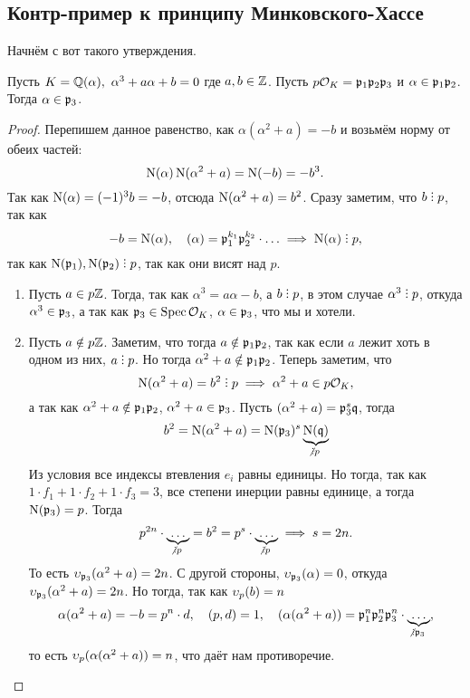 	  \subsection{Контр-пример к принципу Минковского-Хассе}

	  Начнём с вот такого утверждения. 

	  \begin{statement}[ДЗ 11, задача 3]\label{prop-alpha} 
	  	Пусть $K = \mathbb{Q}(\alpha), \ \alpha^3 + a \alpha + b = 0$ где $a, b \in \mathbb{Z}$. Пусть $p\mathcal{O}_{K} = \mathfrak{p}_1 \mathfrak{p}_2 \mathfrak{p}_3$ и $\alpha \in \mathfrak{p}_1 \mathfrak{p}_2$. Тогда $\alpha \in \mathfrak{p}_3$.
	  \end{statement}
	  \begin{proof}
	  	Перепишем данное равенство, как $\alpha(\alpha^2 + a) = - b$ и возьмём норму от обеих частей: 
	  	\[
	  		\operatorname{\mathrm{N}}(\alpha)\operatorname{\mathrm{N}}(\alpha^2 + a) = \operatorname{\mathrm{N}}(-b) = - b^3.
	  	\]
	  	Так как $\operatorname{\mathrm{N}}(\alpha) = (-1)^3 b = -b$, отсюда $\operatorname{\mathrm{N}}(\alpha^2 + a) = b^2$.  Сразу заметим, что $b \divby p$, так как 
	  	\[
	  		-b = \Nm(\alpha) , \quad (\alpha) = \fp_1^{k_1} \fp_{2}^{k_2} \cdot \ldots \implies \Nm(\alpha) \divby p,
	  	\]
	  	так как $\Nm(\fp_1), \Nm(\fp_2) \divby p$, так как они висят над $p$.

	  	\begin{enumerate}
	  		\item Пусть $a \in p\mathbb{Z}$. Тогда, так как $\alpha^3 = a\alpha - b$,  а $b \divby p$, в этом случае $\alpha^3 \divby p$, откуда $\alpha^3 \in \mathfrak{p}_{3}$, а так как $\mathfrak{p}_3 \in \operatorname{Spec}{\mathcal{O}_{K}}$, $\alpha \in \mathfrak{p}_3$, что мы и хотели. 

	  		\item Пусть $a \notin p\mathbb{Z}$. Заметим, что тогда $a \notin \mathfrak{p}_1 \mathfrak{p}_2$, так как если $a$ лежит хоть в одном из них, $a \divby p$.  Но тогда $\alpha^2 + a \notin \mathfrak{p}_1 \mathfrak{p}_2$. Теперь заметим, что 
	  		\[
	  			\Nm(\alpha^2 + a) = b^2 \divby p \implies \alpha^2 + a \in p\cO_{K}, 
	  		\]
	  		а так как $\alpha^2 + a \notin \mathfrak{p}_1\mathfrak{p}_2$, $\alpha^2  + a \in \mathfrak{p}_3$. Пусть $(\alpha^2 + a) = \mathfrak{p}_3^s \mathfrak{q}$, тогда 
	  		\[
	  			b^2 = \Nm(\alpha^2 + a) = \Nm(\fp_3)^s \underbrace{\Nm(\fq)}_{\notdivby p}
	  		\]
	  		Из условия все индексы втевления $e_i$ равны единицы. Но тогда, так как $1 \cdot f_1 + 1 \cdot f_2 + 1 \cdot f_3 = 3$, все степени инерции равны единице, а тогда $\operatorname{\mathrm{N}}(\mathfrak{p}_3) = p$. Тогда 
	  		\[
	  			p^{2n} \cdot \underbrace{\ldots}_{\notdivby p} = b^2 = p^s \cdot \underbrace{\ldots}_{\notdivby p} \implies s = 2n.
	  		\]
	  		То есть $\upsilon_{\mathfrak{p}_3}(\alpha^2 + a) = 2n$. С другой стороны, $\upsilon_{\mathfrak{p}_3}(\alpha) = 0$, откуда  $\upsilon_{\mathfrak{p}_3}(\alpha^2 + a) = 2n$. Но тогда, так как $\upsilon_{p}(b) = n$
	  		\[
	  			\alpha(\alpha^2 + a) = -b = p^n \cdot d, \quad (p, d) = 1, \quad (\alpha(\alpha^2 + a)) = \fp_1^n \fp_2^n \fp_3^n \cdot \underbrace{\ldots}_{\notdivby \fp_3},
	  		\]
	  		то есть $\upsilon_p(\alpha(\alpha^2 + a)) = n$, что даёт нам противоречие. 
	  	\end{enumerate}
	  	\end{proof}
	  	

